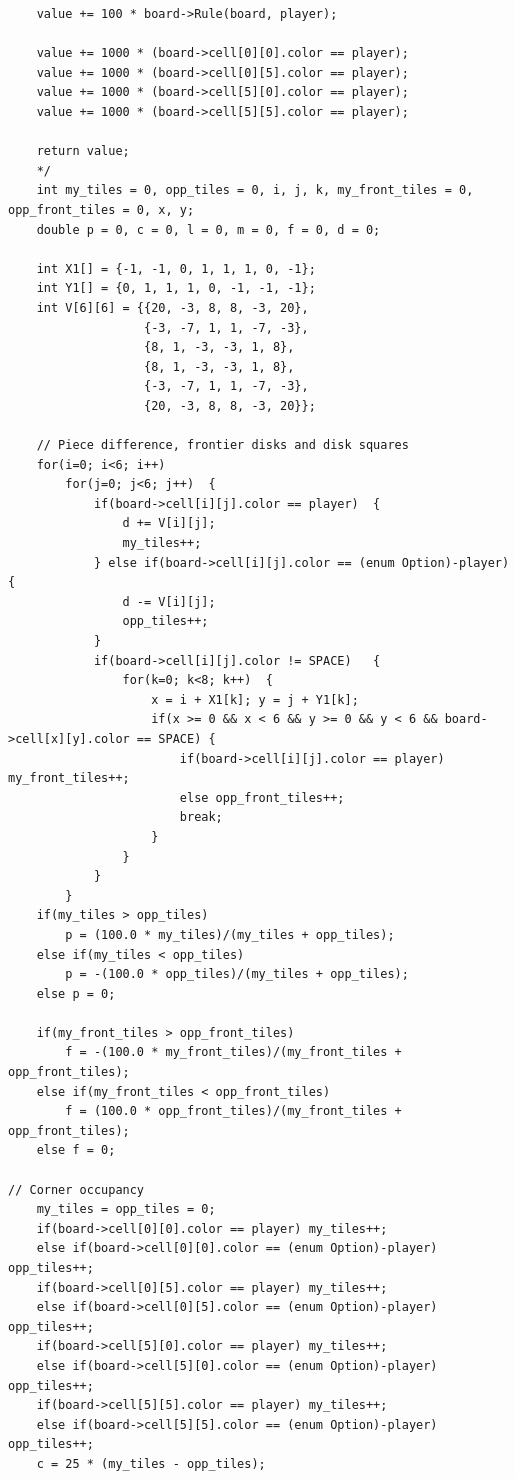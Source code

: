 ﻿\documentclass[a4paper, 11pt]{article}
\begin{document}
\begin{lstlisting}
    value += 100 * board->Rule(board, player);

    value += 1000 * (board->cell[0][0].color == player);
    value += 1000 * (board->cell[0][5].color == player);
    value += 1000 * (board->cell[5][0].color == player);
    value += 1000 * (board->cell[5][5].color == player);

    return value;
    */
    int my_tiles = 0, opp_tiles = 0, i, j, k, my_front_tiles = 0, opp_front_tiles = 0, x, y;
    double p = 0, c = 0, l = 0, m = 0, f = 0, d = 0;

    int X1[] = {-1, -1, 0, 1, 1, 1, 0, -1};
    int Y1[] = {0, 1, 1, 1, 0, -1, -1, -1};
    int V[6][6] = {{20, -3, 8, 8, -3, 20},
                   {-3, -7, 1, 1, -7, -3},
                   {8, 1, -3, -3, 1, 8},
                   {8, 1, -3, -3, 1, 8},
                   {-3, -7, 1, 1, -7, -3},
                   {20, -3, 8, 8, -3, 20}};

    // Piece difference, frontier disks and disk squares
    for(i=0; i<6; i++)
        for(j=0; j<6; j++)  {
            if(board->cell[i][j].color == player)  {
                d += V[i][j];
                my_tiles++;
            } else if(board->cell[i][j].color == (enum Option)-player)  {
                d -= V[i][j];
                opp_tiles++;
            }
            if(board->cell[i][j].color != SPACE)   {
                for(k=0; k<8; k++)  {
                    x = i + X1[k]; y = j + Y1[k];
                    if(x >= 0 && x < 6 && y >= 0 && y < 6 && board->cell[x][y].color == SPACE) {
                        if(board->cell[i][j].color == player)  my_front_tiles++;
                        else opp_front_tiles++;
                        break;
                    }
                }
            }
        }
    if(my_tiles > opp_tiles)
        p = (100.0 * my_tiles)/(my_tiles + opp_tiles);
    else if(my_tiles < opp_tiles)
        p = -(100.0 * opp_tiles)/(my_tiles + opp_tiles);
    else p = 0;

    if(my_front_tiles > opp_front_tiles)
        f = -(100.0 * my_front_tiles)/(my_front_tiles + opp_front_tiles);
    else if(my_front_tiles < opp_front_tiles)
        f = (100.0 * opp_front_tiles)/(my_front_tiles + opp_front_tiles);
    else f = 0;

// Corner occupancy
    my_tiles = opp_tiles = 0;
    if(board->cell[0][0].color == player) my_tiles++;
    else if(board->cell[0][0].color == (enum Option)-player) opp_tiles++;
    if(board->cell[0][5].color == player) my_tiles++;
    else if(board->cell[0][5].color == (enum Option)-player) opp_tiles++;
    if(board->cell[5][0].color == player) my_tiles++;
    else if(board->cell[5][0].color == (enum Option)-player) opp_tiles++;
    if(board->cell[5][5].color == player) my_tiles++;
    else if(board->cell[5][5].color == (enum Option)-player) opp_tiles++;
    c = 25 * (my_tiles - opp_tiles);


\end{lstlisting}
\end{document}
